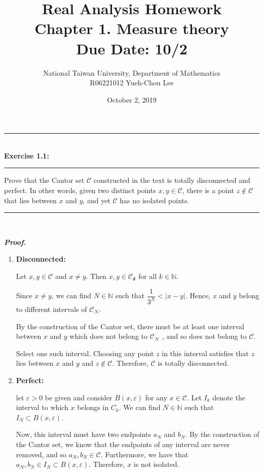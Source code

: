 \documentclass[a4paper,11pt]{article}
\title{Real Analysis Homework\\ Chapter 1. Measure theory\\ Due Date: 10/2}
\author{National Taiwan University, Department of Mathematics\\
R06221012 \hspace{0.2cm} Yueh-Chou Lee}
\date{October 2, 2019}
\begin{document}
\maketitle

\begin{flushleft}
	\rule[-0.5ex]{17cm}{2pt}\\
		\textbf{Exercise 1.1:}\\
	\rule[1.5ex]{17cm}{0.5pt}
		Prove that the Cantor set $\mathcal{C}$ constructed in the text is totally disconnected and perfect. In other words, given two distinct points $x, y \in \mathcal{C}$, there is a point $z \notin \mathcal{C}$ that lies between $x$ and $y$, and yet $\mathcal{C}$ has no isolated points.
	\rule[1.0ex]{17cm}{0.5pt}\
\end{flushleft}

\textbf{\textit{Proof.}}

\begin{enumerate}
	\item \textbf{Disconnected:}

	Let $x, y \in \mathcal{C}$ and $x \neq y$. Then $x, y \in \mathcal{C_k}$ for all $k \in \mathbb{N}$.

	Since $x \neq y$, we can find $N \in \mathbb{N}$ such that $\dfrac{1}{3^N} < |x - y|$. Hence, $x$ and $y$ belong to different intervals of $\mathcal{C_N}$.

	By the construction of the Cantor set, there must be at least one interval between $x$ and $y$ which does not belong to $\mathcal{C_N}$ , and so does not belong to $\mathcal{C}$.

	Select one such interval. Choosing any point $z$ in this interval satisfies that $z$ lies between $x$ and $y$ and $z \notin \mathcal{C}$. Therefore, $\mathcal{C}$ is totally disconnected.\\


	\item \textbf{Perfect:}

	let $\varepsilon > 0$ be given and consider $B(x, \varepsilon)$ for any $x \in \mathcal{C}$. Let $I_k$ denote the interval to which $x$ belongs in $C_k$. We can find $N \in \mathbb{N}$ such that $I_N \subset B(x, \varepsilon)$.

	Now, this interval must have two endpoints $a_N$ and $b_N$. By the construction of the Cantor set, we know that the endpoints of any interval are never removed, and so $a_N, b_N \in \mathcal{C}$. Furthermore, we have that $a_N, b_N \in I_N \subset B(x, \varepsilon)$. Therefore, $x$ is not isolated.\\\\
\end{enumerate}
\end{document}

